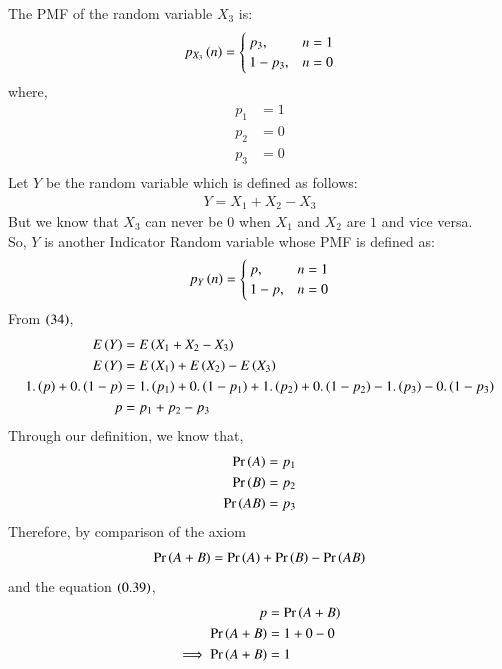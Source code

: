\documentclass[journal]{IEEEtran}
\begin{document}
The PMF of the random variable $X_3$ is:
\begin{align}
	p_{X_3}\left(n\right) =
	\begin{cases}
		p_3 ,& n = 1\\
		1 - p_3 ,& n = 0
	\end{cases}
\end{align}
where,
\begin{align}
	p_1 &= 1\\
	p_2 &= 0\\
	p_3 &= 0\\
\end{align}
Let $Y$ be the random variable which is defined as follows:
\begin{align}
	Y = X_1 + X_2 - X_3
\end{align}
But we know that $X_3$ can never be $0$ when $X_1$ and $X_2$ are $1$ and vice versa.\\
So, $Y$ is another Indicator Random variable whose PMF is defined as:
\begin{align}
	p_{Y}\left(n\right) =
	\begin{cases}
		p ,& n = 1\\
		1 - p ,& n = 0
	\end{cases}
\end{align}
From $\left(34\right)$,
\begin{align}
	E\left(Y\right) &= E\left(X_1 + X_2 - X_3\right)\\
	E\left(Y\right) &= E\left(X_1\right) + E\left(X_2\right) - E\left(X_3\right)\\
	1.\left(p\right) + 0.\left(1 - p\right) &= 1.\left(p_1\right) + 0.\left(1 - p_1\right) + 1.\left(p_2\right) + 0.\left(1 - p_2\right) - 1.\left(p_3\right) - 0.\left(1 - p_3\right)\\
	p &= p_1 + p_2 - p_3
\end{align}
Through our definition, we know that,
\begin{align}
	\Pr\left(A\right) = p_1\\
	\Pr\left(B\right) = p_2\\
	\Pr\left(AB\right) = p_3
\end{align}
Therefore, by comparison of the axiom
\begin{align}
	\Pr\left(A + B\right) = \Pr\left(A\right) + \Pr\left(B\right) - \Pr\left(AB\right)
\end{align}
and the equation $\left(0.39\right)$,
\begin{align}
	p &= \Pr\left(A + B\right)\\
	\Pr\left(A + B\right) &= 1 + 0 - 0\\
	\implies \Pr\left(A + B\right) &= 1
\end{align}
\end{document}
